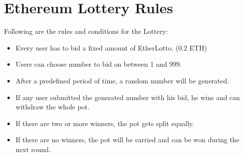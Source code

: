 \chapter{Ethereum Lottery Rules}\label{chap:etherlotto}
\chapterstart

Following are the rules and conditions for the Lottery:
\begin{itemize}
    \item Every user has to bid a fixed amount of EtherLotto. (0.2 ETH)
    \item Users can choose number to bid on between 1 and 999.
    \item After a predefined period of time, a random number will be generated.
    \item If any user submitted the generated number with his bid, he wins and can withdraw the whole pot.
    \item If there are two or more winners, the pot gets split equally.
    \item If there are no winners, the pot will be carried and can be won during the next round.
\end{itemize}


\chapterend

